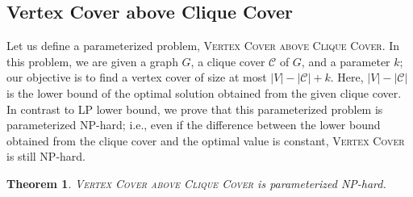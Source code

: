 \documentclass[11pt]{article}
\newtheorem{theorem}{Theorem}
\begin{document}
\subsection{Vertex Cover above Clique Cover}
Let us define a parameterized problem, \textsc{Vertex Cover above Clique Cover}.
In this problem, we are given a graph $G$, a clique cover $\mathcal{C}$ of $G$, and a parameter $k$;
our objective is to find a vertex cover of size at most $|V|-|\mathcal{C}|+k$.
Here, $|V|-|\mathcal{C}|$ is the lower bound of the optimal solution obtained from the given clique
cover.
In contrast to LP lower bound,
we prove that this parameterized problem is parameterized NP-hard; i.e., even if the difference between the lower
bound obtained from the clique cover and the optimal value is constant, \textsc{Vertex Cover} is still NP-hard.
\begin{theorem}\label{thm:above_clique}
\textsc{Vertex Cover above Clique Cover} is parameterized NP-hard.
\end{theorem}
\end{document}

